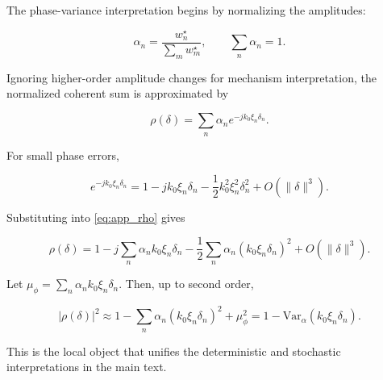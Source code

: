 The phase-variance interpretation begins by normalizing the amplitudes:

\begin{equation}
\alpha_n = \frac{w_n^\star}{\sum_m w_m^\star},
\qquad
\sum_n \alpha_n = 1.
\label{eq:app_alpha}
\end{equation}

Ignoring higher-order amplitude changes for mechanism interpretation, the normalized coherent sum is approximated by

\begin{equation}
\rho(\delta)
= \sum_n \alpha_n e^{-j k_0 \xi_n \delta_n}.
\label{eq:app_rho}
\end{equation}

For small phase errors,

\begin{equation}
e^{-j k_0 \xi_n \delta_n}
= 1 - j k_0 \xi_n \delta_n - \frac{1}{2}k_0^2\xi_n^2\delta_n^2 + O(\lVert\delta\rVert^3).
\label{eq:app_expansion}
\end{equation}

Substituting into \eqref{eq:app_rho} gives

\begin{equation}
\rho(\delta)
= 1
- j\sum_n \alpha_n k_0\xi_n\delta_n
- \frac{1}{2}\sum_n \alpha_n (k_0\xi_n\delta_n)^2
+ O(\lVert\delta\rVert^3).
\label{eq:app_rho_expand}
\end{equation}

Let $\mu_\phi = \sum_n \alpha_n k_0\xi_n\delta_n$. Then, up to second order,

\begin{equation}
|\rho(\delta)|^2
\approx
1 - \sum_n \alpha_n (k_0\xi_n\delta_n)^2 + \mu_\phi^2
= 1 - \mathrm{Var}_\alpha(k_0\xi_n\delta_n).
\label{eq:app_variance}
\end{equation}

This is the local object that unifies the deterministic and stochastic interpretations in the main text.
